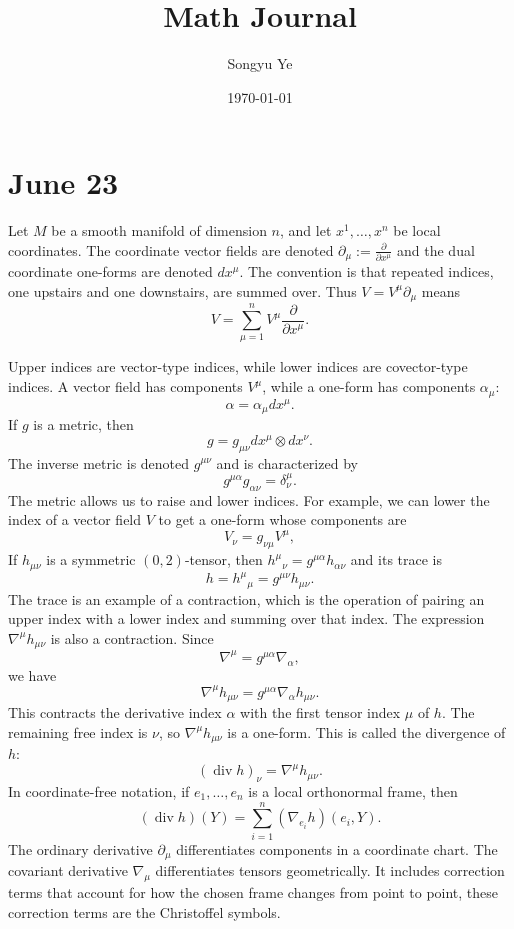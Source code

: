 \documentclass[12pt]{article}
\begin{document}
\rhead{\today}
\cfoot{\thepage}

\title{Math Journal}

\author{Songyu Ye}
\date{\today}
\maketitle


\tableofcontents

\section{June 23}

Let $M$ be a smooth manifold of dimension $n$, and let $x^1,\ldots,x^n$ be local coordinates. The coordinate vector fields are denoted $\partial_\mu := \frac{\partial}{\partial x^\mu}$ and the dual coordinate one-forms are denoted $dx^\mu$. The convention is that repeated indices, one upstairs and one downstairs, are summed over. Thus $V = V^\mu \partial_\mu$
means
\[
    V = \sum_{\mu=1}^n V^\mu \frac{\partial}{\partial x^\mu}.
\]

Upper indices are vector-type indices, while lower indices are covector-type indices. A vector field has components $V^\mu$, while a one-form has components $\alpha_\mu$:
\[
    \alpha = \alpha_\mu dx^\mu.
\]
If $g$ is a metric, then
\[
    g = g_{\mu\nu} dx^\mu \otimes dx^\nu.
\]
The inverse metric is denoted $g^{\mu\nu}$ and is characterized by
\[
    g^{\mu\alpha}g_{\alpha\nu} = \delta^\mu_\nu.
\]
The metric allows us to raise and lower indices. For example, we can lower the index of a vector field $V$ to get a one-form whose components are
\[
    V_\nu = g_{\nu\mu}V^\mu,
\]
If $h_{\mu\nu}$ is a symmetric $(0,2)$-tensor, then $h^\mu{}_{\nu} = g^{\mu\alpha}h_{\alpha\nu}$
and its trace is
\[
    h = h^\mu{}_{\mu} = g^{\mu\nu}h_{\mu\nu}.
\]
The trace is an example of a contraction, which is the operation of pairing an upper index with a lower index and summing over that index.
The expression $\nabla^\mu h_{\mu\nu}$
is also a contraction. Since
\[
    \nabla^\mu = g^{\mu\alpha}\nabla_\alpha,
\]
we have
\[
    \nabla^\mu h_{\mu\nu}
    = g^{\mu\alpha}\nabla_\alpha h_{\mu\nu}.
\]
This contracts the derivative index $\alpha$ with the first tensor index $\mu$ of $h$. The remaining free index is $\nu$, so $\nabla^\mu h_{\mu\nu}$ is a one-form. This is called the divergence of $h$:
\[
    (\operatorname{div} h)_\nu = \nabla^\mu h_{\mu\nu}.
\]
In coordinate-free notation, if $e_1,\ldots,e_n$ is a local orthonormal frame, then
\[
    (\operatorname{div}h)(Y)
    = \sum_{i=1}^n (\nabla_{e_i}h)(e_i,Y).
\]
The ordinary derivative $\partial_\mu$ differentiates components in a coordinate chart. The covariant derivative $\nabla_\mu$ differentiates tensors geometrically. It includes correction terms that account for how the chosen frame changes from point to point, these correction terms are the Christoffel symbols.
\end{document}
